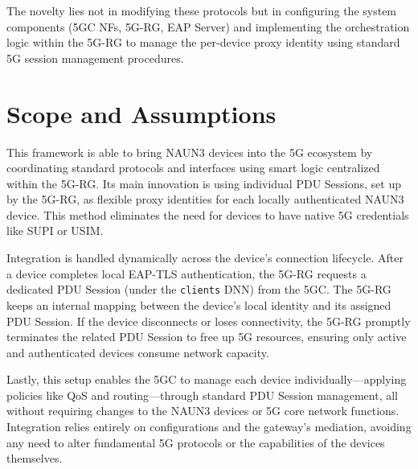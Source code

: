 The novelty lies not in modifying these protocols but in configuring the system components (\ac{5GC} \acp{NF}, \ac{5G-RG}, \ac{EAP} Server) and implementing the orchestration logic within the \ac{5G-RG} to manage the per-device proxy identity using standard \ac{5G} session management procedures.

\section{Scope and Assumptions}

This framework is able to bring \ac{NAUN3} devices into the \ac{5G} ecosystem by coordinating standard protocols and interfaces using smart logic centralized within the \ac{5G-RG}. Its main innovation is using individual \ac{PDU} Sessions, set up by the \ac{5G-RG}, as flexible proxy identities for each locally authenticated \ac{NAUN3} device. This method eliminates the need for devices to have native \ac{5G} credentials like \ac{SUPI} or \ac{USIM}.

Integration is handled dynamically across the device's connection lifecycle. After a device completes local \ac{EAP-TLS} authentication, the \ac{5G-RG} requests a dedicated \ac{PDU} Session (under the \texttt{clients} \ac{DNN}) from the \ac{5GC}. The \ac{5G-RG} keeps an internal mapping between the device's local identity and its assigned \ac{PDU} Session. If the device disconnects or loses connectivity, the \ac{5G-RG} promptly terminates the related \ac{PDU} Session to free up \ac{5G} resources, ensuring only active and authenticated devices consume network capacity.

Lastly, this setup enables the \ac{5GC} to manage each device individually—applying policies like \ac{QoS} and routing—through standard \ac{PDU} Session management, all without requiring changes to the \ac{NAUN3} devices or \ac{5G} core network functions. Integration relies entirely on configurations and the gateway's mediation, avoiding any need to alter fundamental \ac{5G} protocols or the capabilities of the devices themselves.